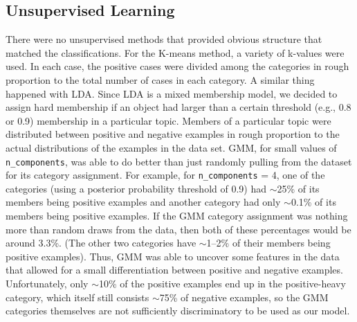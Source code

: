 \subsection{Unsupervised Learning}
There were no unsupervised methods that provided obvious structure  that matched the classifications.  For the K-means method, a variety of k-values were used.  In each case, the positive cases were divided among the categories in rough proportion to the total number of cases in each category.  A similar thing happened with LDA.  Since LDA is a mixed membership model, we decided to assign hard membership if an object had larger than a certain threshold (e.g., 0.8 or 0.9) membership in a particular topic.  Members of a particular topic were distributed between positive and negative examples in rough proportion to the actual distributions of the examples in the data set.  GMM, for small values of \texttt{n\_components}, was able to do better than just randomly pulling from the dataset for its category assignment.  For example, for \texttt{n\_components} = 4, one of the categories (using a posterior probability threshold of 0.9) had ${\sim}$25\% of its members being positive examples and another category had only ${\sim}$0.1\% of its members being positive examples.  If the GMM category assignment was nothing more than random draws from the data, then both of these percentages would be around 3.3\%.  (The other two categories have ${\sim}$1--2\% of their members being positive examples).  Thus, GMM was able to uncover some features in the data that allowed for a small differentiation between positive and negative examples.  Unfortunately, only ${\sim}$10\% of the positive examples end up in the positive-heavy category, which itself still consists ${\sim}$75\% of negative examples, so the GMM categories themselves are not sufficiently discriminatory to be used as our model.

